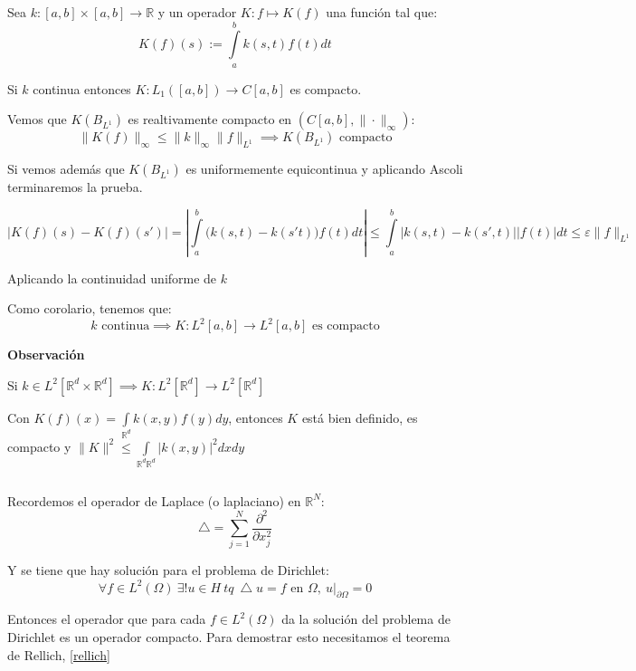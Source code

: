 \documentclass[openany]{book}
\begin{document}
\begin{example}$ $
    
    Sea $ k: [a,b] \times [a,b] \to \mathbb{R}$ y un operador $ K: f \mapsto K(f)$ una función tal que:
    $$ K(f)(s) := \int\limits_{a}^{b} k(s,t) f(t) dt  $$

        Si $ k$ continua entonces $ K: L_1([a,b]) \to C[a,b]$ es compacto.

        \begin{demonstration}
            Vemos que $ K(B_{L^{1}})$ es realtivamente compacto en $ (C[a,b],\|\cdot \|_{\infty})$:
            $$ \|K(f)\|_{\infty} \leq  \|k\|_{\infty} \|f\|_{L^{1}} \implies K(B_{L^{1}}) \text{ compacto}$$

            Si vemos además que $ K(B_{L^{1}})$ es uniformemente equicontinua y aplicando Ascoli terminaremos la prueba.

            $$ |K(f)(s)- K(f)(s')| =\left| \int\limits_{a}^{b}  \Big ( k(s,t)-k(s't) \Big ) f(t) dt \right|\leq  \int\limits_{a}^{b} \left| k(s,t)-k(s',t) \right| |f(t)| dt \leq  \varepsilon \|f\|_{L^{1}}$$
            
            Aplicando la continuidad uniforme de $ k$

        \end{demonstration}

        Como corolario, tenemos que:
        $$ k \text{ continua} \implies K: L^2[a,b] \to L^2[a,b] \text{ es compacto} $$

        \begin{flushright}
            \textbf{Observación}
        \end{flushright}

        Si $ k \in L^2[\mathbb{R}^{d} \times \mathbb{R}^{d}] \implies K: L^2[\mathbb{R}^{d}] \to L^2[\mathbb{R}^{d}] $

        Con $ K(f)(x) = \int\limits_{\mathbb{R}^{d}}^{} k(x,y)f(y)dy$, entonces $ K$ está bien definido, es compacto y $ \|K\|^2 \leq  \int\limits_{\mathbb{R}^{d}\mathbb{R}^{d}}^{}|k(x,y)|^2dxdy$

\end{example}

\begin{example}$ $
    
    Recordemos el operador de Laplace (o laplaciano) en $ \mathbb{R}^{N}$:
    $$ \bigtriangleup = \sum\limits_{j=1}^{N} \dfrac{\partial ^2}{\partial x_j^2} $$

    Y se tiene que hay solución para el problema de Dirichlet:
    $$ \forall f \in L^2(\Omega ) \ \exists! u \in H\  tq\ \bigtriangleup u = f \text{ en } \Omega,\ u|_{\partial \Omega } = 0 $$

    Entonces el operador que para cada $ f \in L^2 (\Omega )$ da la solución del problema de Dirichlet es un operador compacto. Para demostrar esto necesitamos el teorema de Rellich, \ref{rellich}

\end{example}
\end{document}
